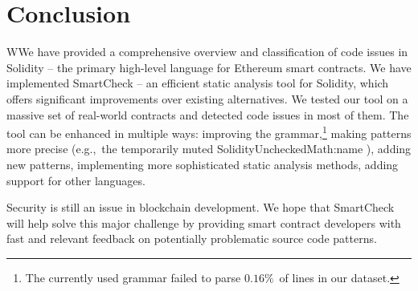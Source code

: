 \section{Conclusion}
	
WWe have provided a comprehensive overview and classification of code issues in Solidity -- the primary high-level language for Ethereum smart contracts.
We have implemented SmartCheck -- an efficient static analysis tool for Solidity, which offers significant improvements over existing alternatives.
We tested our tool on a massive set of real-world contracts and detected code issues in most of them.
The tool can be enhanced in multiple ways: improving the grammar,\footnote{The currently used grammar failed to parse $0.16\%$~of lines in our dataset.} making patterns more precise (e.g.,~the temporarily muted {\usevalue SolidityUncheckedMath:name }), adding new patterns, implementing more sophisticated static analysis methods, adding support for other languages.

Security is still an issue in blockchain development.
We hope that SmartCheck will help solve this major challenge by providing smart contract developers with fast and relevant feedback on potentially problematic source code patterns.